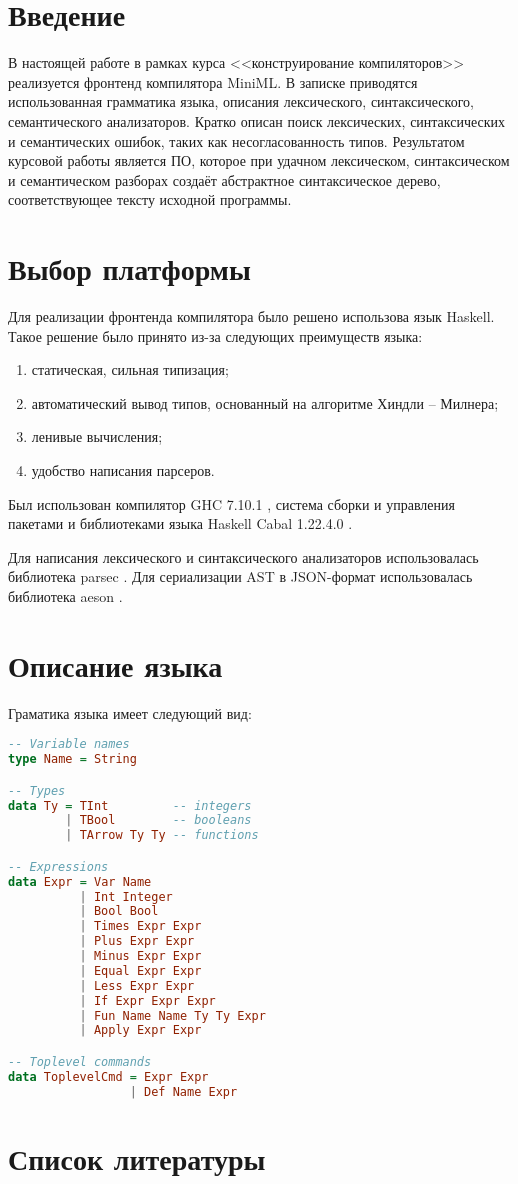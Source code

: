 \documentclass[a4paper,12pt]{article}
\numberwithin{equation}{section}
\begin{document}
\tableofcontents

\section{Введение}
В настоящей работе в рамках курса <<конструирование компиляторов>>
реализуется фронтенд компилятора MiniML. В записке приводятся
использованная грамматика языка, описания лексического,
синтаксического, семантического анализаторов. Кратко описан поиск
лексических, синтаксических и семантических ошибок, таких как
несогласованность типов. Результатом курсовой работы является ПО,
которое при удачном лексическом, синтаксическом и семантическом
разборах создаёт абстрактное синтаксическое дерево, соответствующее
тексту исходной программы.

\section{Выбор платформы} 
Для реализации фронтенда компилятора было решено использова язык
Haskell. Такое решение было принято из-за следующих преимуществ языка:
\begin{enumerate}
\item статическая, сильная типизация;
\item автоматический вывод типов, основанный на алгоритме Хиндли -- Милнера;
\item ленивые вычисления;
\item удобство написания парсеров.
\end{enumerate}
Был использован компилятор GHC 7.10.1 \cite{ghc}, система сборки и управления
пакетами и библиотеками языка Haskell Cabal 1.22.4.0 \cite{cabal}.


Для написания лексического и синтаксического анализаторов использовалась
библиотека parsec \cite{parsec}. Для сериализации AST в JSON-формат
использовалась библиотека aeson \cite{aeson}.

\section{Описание языка}
Граматика языка имеет следующий вид:

\begin{lstlisting}[language=haskell]
-- Variable names
type Name = String

-- Types
data Ty = TInt         -- integers
        | TBool        -- booleans
        | TArrow Ty Ty -- functions

-- Expressions
data Expr = Var Name
          | Int Integer
          | Bool Bool
          | Times Expr Expr
          | Plus Expr Expr
          | Minus Expr Expr
          | Equal Expr Expr
          | Less Expr Expr
          | If Expr Expr Expr
          | Fun Name Name Ty Ty Expr
          | Apply Expr Expr

-- Toplevel commands
data ToplevelCmd = Expr Expr
                 | Def Name Expr
\end{lstlisting}

\section{Список литературы}
\printbibliography[heading=none]
\end{document}
